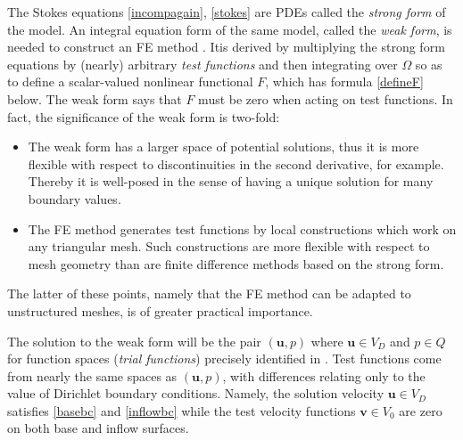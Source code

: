 \documentclass[letterpaper,final,12pt,reqno]{amsart}
\newcommand{\bu}{\mathbf{u}}
\newcommand{\bv}{\mathbf{v}}
\begin{document}
The Stokes equations \eqref{incompagain}, \eqref{stokes} are PDEs called the \emph{strong form} of the model.  An integral equation form of the same model, called the \emph{weak form}, is needed to construct an FE method \cite{Elmanetal2014}.  Itis derived by multiplying the strong form equations by (nearly) arbitrary \emph{test functions} and then integrating over $\Omega$ so as to define a scalar-valued nonlinear functional $F$, which has formula \eqref{defineF} below.  The weak form says that $F$ must be zero when acting on test functions.  In fact, the significance of the weak form is two-fold:
\begin{itemize}
\item The weak form has a larger space of potential solutions, thus it is more flexible with respect to discontinuities in the second derivative, for example.  Thereby it is well-posed in the sense of having a unique solution \cite{JouvetRappaz2011} for many boundary values.
\item The FE method generates test functions by local constructions which work on any triangular mesh.  Such constructions are more flexible with respect to mesh geometry than are finite difference methods based on the strong form.
\end{itemize}
The latter of these points, namely that the FE method can be adapted to unstructured meshes, is of greater practical importance.

The solution to the weak form will be the pair $(\bu,p)$ where $\bu\in V_D$ and $p \in Q$ for function spaces (\emph{trial functions}) precisely identified in \cite{JouvetRappaz2011}.  Test functions come from nearly the same spaces as $(\bu,p)$, with differences relating only to the value of Dirichlet boundary conditions.  Namely, the solution velocity $\bu\in V_D$ satisfies \eqref{basebc} and \eqref{inflowbc} while the test velocity functions $\bv\in V_0$ are zero on both base and inflow surfaces.
\end{document}
